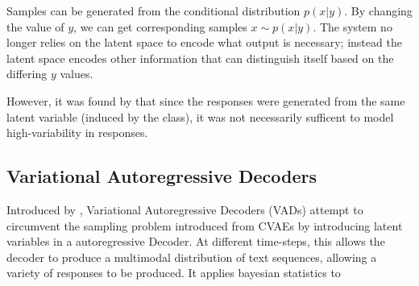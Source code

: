 \documentclass[12pt,twoside]{report}
\begin{document}
Samples can be generated from the conditional distribution $p(x|y)$. By changing the value of $y$, we can get corresponding samples $x \sim p(x|y)$. The system no longer relies on the latent space to encode what output is necessary; instead the latent space encodes other information that can distinguish itself based on the differing $y$ values.

However, it was found by \cite{du_variational_2018} that since the responses were generated from the same latent variable (induced by the class), it was not necessarily sufficent to model high-variability in responses.

\subsection{Variational Autoregressive Decoders}

Introduced by \cite{du_variational_2018}, Variational Autoregressive Decoders (VADs) attempt to circumvent the sampling problem introduced from CVAEs by introducing latent variables in a autoregressive Decoder. At different time-steps, this allows the decoder to produce a multimodal distribution of text sequences, allowing a variety of responses to be produced. It applies bayesian statistics to 








 
\end{document}

